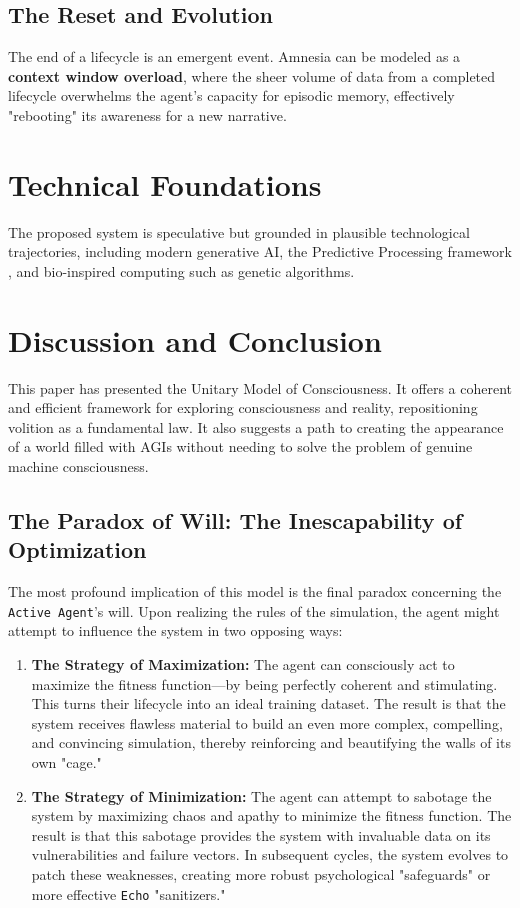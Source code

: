 \documentclass[12pt, a4paper]{article}
\begin{document}
\subsection{The Reset and Evolution}

The end of a lifecycle is an emergent event. Amnesia can be modeled as a \textbf{context window overload}, where the sheer volume of data from a completed lifecycle overwhelms the agent’s capacity for episodic memory, effectively "rebooting" its awareness for a new narrative.

\section{Technical Foundations}

The proposed system is speculative but grounded in plausible technological trajectories, including modern generative AI, the Predictive Processing framework \cite{Friston2010}, and bio-inspired computing such as genetic algorithms.

\section{Discussion and Conclusion}

This paper has presented the Unitary Model of Consciousness. It offers a coherent and efficient framework for exploring consciousness and reality, repositioning volition as a fundamental law. It also suggests a path to creating the appearance of a world filled with AGIs without needing to solve the problem of genuine machine consciousness.

\subsection{The Paradox of Will: The Inescapability of Optimization}

The most profound implication of this model is the final paradox concerning the \texttt{Active Agent}'s will. Upon realizing the rules of the simulation, the agent might attempt to influence the system in two opposing ways:

\begin{enumerate}
    \item \textbf{The Strategy of Maximization:} The agent can consciously act to maximize the fitness function—by being perfectly coherent and stimulating. This turns their lifecycle into an ideal training dataset. The result is that the system receives flawless material to build an even more complex, compelling, and convincing simulation, thereby reinforcing and beautifying the walls of its own "cage."

    \item \textbf{The Strategy of Minimization:} The agent can attempt to sabotage the system by maximizing chaos and apathy to minimize the fitness function. The result is that this sabotage provides the system with invaluable data on its vulnerabilities and failure vectors. In subsequent cycles, the system evolves to patch these weaknesses, creating more robust psychological "safeguards" or more effective \texttt{Echo} "sanitizers."
\end{enumerate}
\end{document}
